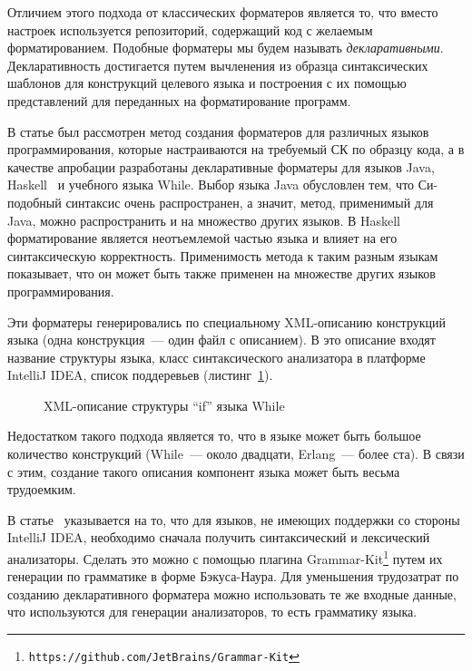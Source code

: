 \documentclass[conference]{IEEEtran}
\begin{document}
Отличием этого подхода от классических форматеров является то, что вместо настроек используется репозиторий, содержащий код с желаемым форматированием.
Подобные форматеры мы будем называть \emph{декларативными}.
Декларативность достигается путем вычленения из образца синтаксических шаблонов для конструкций целевого языка и построения с их помощью представлений для переданных на форматирование программ.

В статье был рассмотрен метод создания форматеров для различных языков программирования, которые настраиваются на требуемый СК по образцу кода, а в качестве апробации разработаны декларативные форматеры для языков Java, Haskell~\cite{korDiploma} и учебного языка While.
Выбор языка Java обусловлен тем, что Си-подобный синтаксис очень распространен, а значит, метод, применимый для Java, можно распространить и на множество других языков.
В Haskell форматирование является неотъемлемой частью языка и влияет на его синтаксическую корректность. 
Применимость метода к таким разным языкам показывает, что он может быть также применен на множестве других языков программирования.

Эти форматеры генерировались по специальному XML-описанию конструкций языка (одна конструкция~--- один файл с описанием). 
В это описание входят название структуры языка, класс синтаксического анализатора в платформе IntelliJ IDEA, список поддеревьев (листинг~\ref{fig:whileXml}).

\begin{figure}[h]
	\centering
	
	\caption{XML-описание структуры ``if'' языка While}
	\label{fig:whileXml}
\end{figure}

Недостатком такого подхода является то, что в языке может быть большое количество конструкций (While~--- около двадцати, Erlang~--- более ста).
В связи с этим, создание такого описания компонент языка может быть весьма трудоемким.

В статье~\cite{while} указывается на то, что для языков, не имеющих поддержки со стороны IntelliJ IDEA, необходимо сначала получить синтаксический и лексический анализаторы.
Сделать это можно с помощью плагина Grammar-Kit\footnote{\texttt{https://github.com/JetBrains/Grammar-Kit}} путем их генерации по грамматике в форме Бэкуса-Наура.
Для уменьшения трудозатрат по созданию декларативного форматера можно использовать те же входные данные, что используются для генерации анализаторов, то есть грамматику языка.
\end{document}
